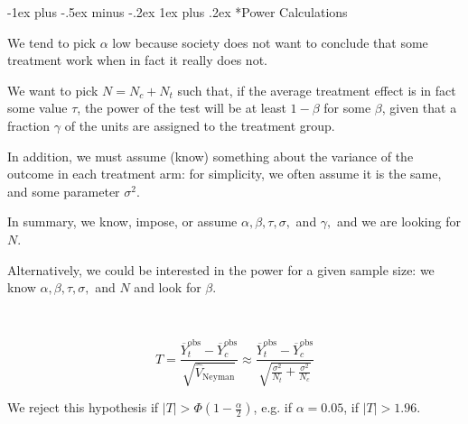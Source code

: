 \documentclass[a4paper,10pt,landscape]{article}
\makeatletter
\renewcommand{\subsubsection}{\@startsection{subsubsection}{3}{0mm}%
                                {-1ex plus -.5ex minus -.2ex}%
                                {1ex plus .2ex}%
                                {\normalfont\small\bfseries}}
\makeatother
\begin{document}
\begin{multicols*}{3}
\subsubsection*{Power Calculations}

\begin{description}
	\item We tend to pick $\alpha$ low because society does not want to conclude that some treatment work when in fact it really does not.
	\item We want to pick $N=N_c+N_t$ such that, if the average treatment effect is in fact some value $\tau$, the power of the test will be at least $1-\beta$ for some $\beta$, given that a fraction $\gamma$ of the units are assigned to the treatment group.
	\item In addition, we must assume (know) something about the variance of the outcome in each treatment arm: for simplicity, we often assume it is the same, and some parameter $\sigma^2$.
	\item In summary, we know, impose, or assume $\alpha,\beta,\tau,\sigma,$ and $\gamma,$ and we are looking for $N$.
	\item Alternatively, we could be interested in the power for a given sample size: we know $\alpha,\beta,\tau,\sigma,$ and $N$ and look for $\beta$.
	\item ~
	
	$$T=\dfrac{\overline{Y}_t^\text{obs}-\overline{Y}_c^\text{obs}}{\sqrt{\hat{V}_\text{Neyman}}}\approx\dfrac{\overline{Y}_t^\text{obs}-\overline{Y}_c^\text{obs}}{\sqrt{\frac{\sigma^2}{N_t}+\frac{\sigma^2}{N_c}}}$$
	\item We reject this hypothesis if $|T|>\Phi\left(1-\frac{\alpha}{2}\right)$, e.g. if $\alpha=0.05$, if $|T|>1.96$.
	

\end{description}
\end{multicols*}
\end{document}
